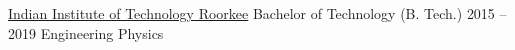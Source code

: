 
{\href{https://www.iitr.ac.in/}{Indian Institute of Technology Roorkee}}
{Bachelor of Technology (B. Tech.)}
{2015 -- 2019}
{Engineering Physics}

\vspace{-0.4cm}%